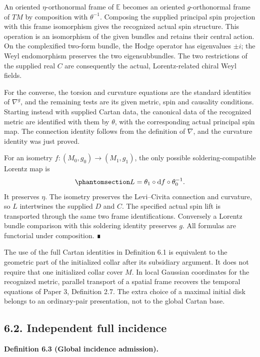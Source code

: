 \documentclass[
  english,
  11pt,
  reqno]{amsart}
\makeatletter
\newcommand{\paperdisplaynext}{%
  \let\paper@savedstartsection\@startsection
  \def\@startsection##1##2##3##4##5##6{%
    \let\@startsection\paper@savedstartsection
    \@tempskipa ##5\relax
    \ifdim\@tempskipa<\z@
      \def\paper@afterskip{.35\baselineskip}%
    \else
      \def\paper@afterskip{##5}%
    \fi
    \@startsection{##1}{##2}{##3}{##4}{\paper@afterskip}{##6}}}
\newcommand{\paperdisplaysection}{\paperdisplaynext\subsection}
\newcommand{\pandocstatementheading}[1]{%
  \par\if@nobreak\else
    \addpenalty{\@beginparpenalty}%
    \addvspace{.5\baselineskip plus .2\baselineskip minus .2\baselineskip}%
  \fi
  {\normalfont\bfseries #1\par}%
  \nobreak\@afterindenttrue\@afterheading
}
\makeatother
\begin{document}
An oriented \(\eta\)-orthonormal frame of \(\mathbb E\) becomes an
oriented \(g\)-orthonormal frame of \(TM\) by composition with
\(\theta^{-1}\). Composing the supplied principal spin projection with
this frame isomorphism gives the recognized actual spin structure. This
operation is an isomorphism of the given bundles and retains their
central action. On the complexified two-form bundle, the Hodge operator
has eigenvalues \(\pm i\); the Weyl endomorphism preserves the two
eigensubbundles. The two restrictions of the supplied real \(C\) are
consequently the actual, Lorentz-related chiral Weyl fields.

For the converse, the torsion and curvature equations are the standard
identities of \(\nabla^g\), and the remaining tests are its given
metric, spin and causality conditions. Starting instead with supplied
Cartan data, the canonical data of the recognized metric are identified
with them by \(\theta\), with the corresponding actual principal spin
map. The connection identity follows from the definition of \(\nabla\),
and the curvature identity was just proved.

For an isometry \(f:(M_0,g_0)\to(M_1,g_1)\), the only possible
soldering-compatible Lorentz map is
\begin{equation}\protect\phantomsection\label{eq:global-cartan-comparison-map}{
L=\theta_1\circ\mathrm df\circ\theta_0^{-1}.
}\end{equation} It preserves \(\eta\). The isometry preserves the
Levi--Civita connection and curvature, so \(L\) intertwines the supplied
\(D\) and \(C\). The specified actual spin lift is transported through
the same two frame identifications. Conversely a Lorentz bundle
comparison with this soldering identity preserves \(g\). All formulas
are functorial under composition. ∎

The use of the full Cartan identities in Definition 6.1 is equivalent to
the geometric part of the initialized collar after its subsidiary
argument. It does not require that one initialized collar cover \(M\).
In local Gaussian coordinates for the recognized metric, parallel
transport of a spatial frame recovers the temporal equations of Paper 3,
Definition 2.7. The extra choice of a maximal initial disk belongs to an
ordinary-pair presentation, not to the global Cartan base.

\protect{}\label{sec:global-independent-incidence}
\paperdisplaysection{6.2. Independent full
incidence}\label{independent-full-incidence}
\pandocstatementheading{\protect{}\label{def:global-independent-incidence}Definition 6.3 (Global incidence admission).}
\end{document}
